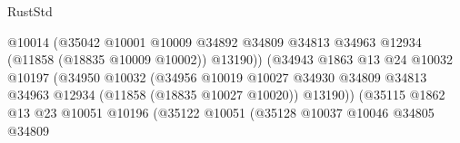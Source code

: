 \begin{lexlean}{RustStd}
\begin{coremodule}
                                                    @10014
                                                    (@35042
                                                      @10001
                                                      @10009
                                                      @34892
                                                      @34809
                                                      @34813
                                                      @34963
                                                      @12934
                                                      (@11858 (@18835 @10009 @10002))
                                                      @13190))
                                                  (@34943
                                                    @1863
                                                    @13
                                                    @24
                                                    @10032
                                                    @10197
                                                    (@34950
                                                      @10032
                                                      (@34956
                                                        @10019
                                                        @10027
                                                        @34930
                                                        @34809
                                                        @34813
                                                        @34963
                                                        @12934
                                                        (@11858 (@18835 @10027 @10020))
                                                        @13190))
                                                    (@35115
                                                      @1862
                                                      @13
                                                      @23
                                                      @10051
                                                      @10196
                                                      (@35122
                                                        @10051
                                                        (@35128
                                                          @10037
                                                          @10046
                                                          @34805
                                                          @34809

\end{coremodule}
\end{lexlean}
